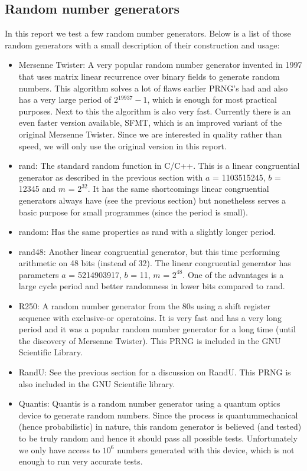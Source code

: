 \documentclass[10pt,a4paper]{article}
\begin{document}
\subsection{Random number generators}
\label{sec:rng}
\noindent In this report we test a few random number generators. Below is a list of those random generators with a small description of their construction and usage:
\begin{itemize}
  \item
    Mersenne Twister: A very popular random number generator invented in 1997 that uses matrix linear recurrence over binary fields to generate random numbers. This algorithm solves a lot of flaws earlier PRNG's had and also has a very large period of 2$^{19937}-1$, which is enough for most practical purposes. Next to this the algorithm is also very fast. Currently there is an even faster version available, SFMT, which is an improved variant of the original Mersenne Twister. Since we are interested in quality rather than speed, we will only use the original version in this report.
  \item
    rand: The standard random function in C/C++. This is a linear congruential generator as described in the previous section with $a$ = 1103515245, $b$ = 12345 and $m$ = $2^{32}$. It has the same shortcomings linear congruential generators always have (see the previous section) but nonetheless serves a basic purpose for small programmes (since the period is small).
  \item
    random: Has the same properties as rand with a slightly longer period.
  \item
    rand48: Another linear congruential generator, but this time performing arithmetic on 48 bits (instead of 32). The linear congruential generator has parameters $a$ = 5214903917, $b$ = 11, $m$ = $2^{48}$. One of the advantages is a large cycle period and better randomness in lower bits compared to rand.
  \item
    R250: A random number generator from the 80s using a shift register sequence with exclusive-or operatoins. It is very fast and has a very long period and it was a popular random number generator for a long time (until the discovery of Mersenne Twister). This PRNG is included in the GNU Scientific Library.
  \item
    RandU: See the previous section for a discussion on RandU. This PRNG is also included in the GNU Scientific library.
  \item 
    Quantis: Quantis is a random number generator using a quantum optics device to generate random numbers. Since the process is quantummechanical (hence probabilistic) in nature, this random generator is believed (and tested) to be truly random and hence it should pass all possible tests. Unfortunately we only have access to $10^6$ numbers generated with this device, which is not enough to run very accurate tests. 
\end{itemize}
\end{document}
